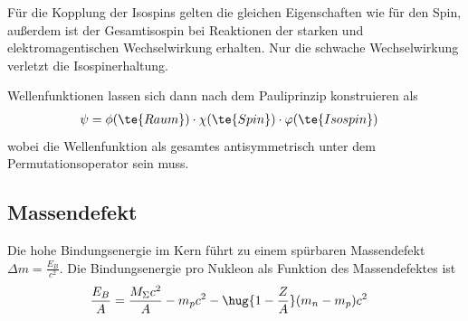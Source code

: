 \documentclass[twocolumn]{summery_4.1}
\begin{document}
Für die Kopplung der Isospins gelten die gleichen Eigenschaften wie für den Spin, außerdem ist der Gesamtisospin bei Reaktionen der starken und elektromagentischen Wechselwirkung erhalten. Nur die schwache Wechselwirkung verletzt die Isospinerhaltung.

Wellenfunktionen lassen sich dann nach dem Pauliprinzip konstruieren als
\begin{align*}
    \psi &= \phi(\te{Raum}) \cdot \chi(\te{Spin}) \cdot \varphi (\te{Isospin})
\end{align*}
wobei die Wellenfunktion als gesamtes antisymmetrisch unter dem Permutationsoperator sein muss. 

\subsection{Massendefekt}
Die hohe Bindungsenergie im Kern führt zu einem spürbaren Massendefekt \(\Delta m = \frac{E_B}{c^2}\). Die Bindungsenergie pro Nukleon als Funktion des Massendefektes ist 
\begin{align*}
    \frac{E_B}{A} &= \frac{M_\Sigma c^2}{A} - m_p c^2 - \hug{1-\frac ZA} (m_n - m_p)c^2
\end{align*}
\end{document}
